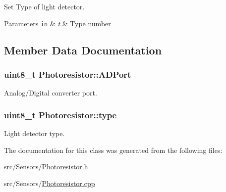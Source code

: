 Set Type of light detector. 


\begin{DoxyParams}[1]{Parameters}
\mbox{\tt in}  & {\em t} & Type number \\
\hline
\end{DoxyParams}


\subsection{Member Data Documentation}
\subsubsection[{\texorpdfstring{A\+D\+Port}{ADPort}}]{\setlength{\rightskip}{0pt plus 5cm}uint8\+\_\+t Photoresistor\+::\+A\+D\+Port\hspace{0.3cm}{\ttfamily [private]}}\hypertarget{classPhotoresistor_a550c85d1df00f323cd2fb86bb3d73c15}{}\label{classPhotoresistor_a550c85d1df00f323cd2fb86bb3d73c15}


Analog/\+Digital converter port. 

\subsubsection[{\texorpdfstring{type}{type}}]{\setlength{\rightskip}{0pt plus 5cm}uint8\+\_\+t Photoresistor\+::type\hspace{0.3cm}{\ttfamily [private]}}\hypertarget{classPhotoresistor_a0edaea79b0038417748c103f3647bd7d}{}\label{classPhotoresistor_a0edaea79b0038417748c103f3647bd7d}


Light detector type. 



The documentation for this class was generated from the following files\+:\begin{DoxyCompactItemize}
\item 
src/\+Sensors/\hyperlink{Photoresistor_8h}{Photoresistor.\+h}\item 
src/\+Sensors/\hyperlink{Photoresistor_8cpp}{Photoresistor.\+cpp}\end{DoxyCompactItemize}
